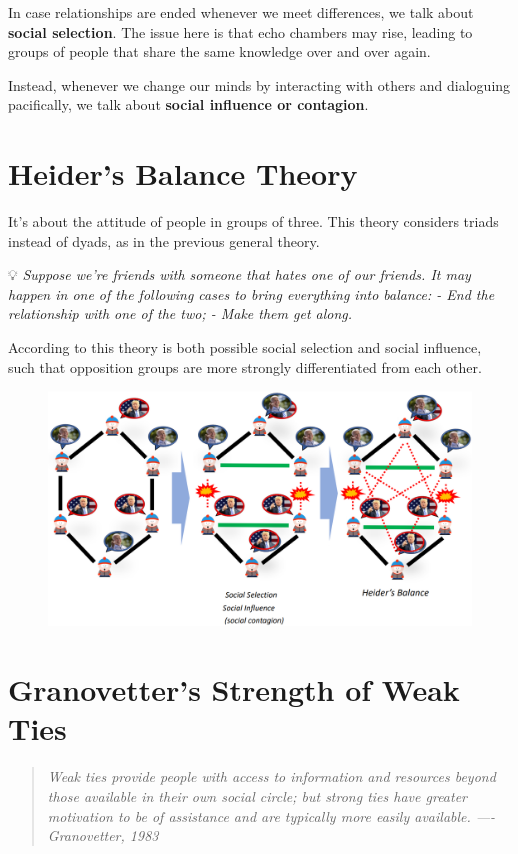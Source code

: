 \documentclass[
  notitlepage,
  onecolumn,
  openany]{book}
\begin{document}
In case relationships are ended whenever we meet differences, we talk about \textbf{social selection}. The issue here is that echo chambers may rise, leading to groups of people that share the same knowledge over and over again.

Instead, whenever we change our minds by interacting with others and dialoguing pacifically, we talk about \textbf{social influence or contagion}.

\hypertarget{heiders-balance-theory}{%
\section{Heider's Balance Theory}\label{heiders-balance-theory}}

It's about the attitude of people in groups of three. This theory considers triads instead of dyads, as in the previous general theory.

💡 \emph{Suppose we're friends with someone that hates one of our friends. It may happen in one of the following cases to bring everything into balance:
- End the relationship with one of the two;
- Make them get along.}

According to this theory is both possible social selection and social influence, such that opposition groups are more strongly differentiated from each other.

\begin{figure}[h!]

{\centering \includegraphics[width=0.5\linewidth]{images/07-Triads and structural holes/Untitled} 

}

\end{figure}

\hypertarget{granovetters-strength-of-weak-ties}{%
\section{Granovetter's Strength of Weak Ties}\label{granovetters-strength-of-weak-ties}}

\begin{quote}
\emph{Weak ties provide people with access to information and resources
beyond those available in their own social circle; but strong ties have
greater motivation to be of assistance and are typically more easily
available.
---- Granovetter, 1983}
\end{quote}
\end{document}
